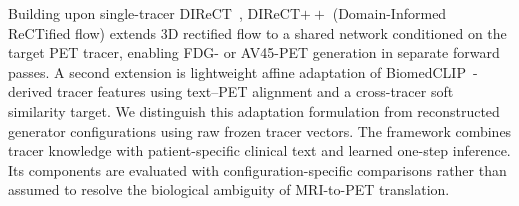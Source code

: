 Building upon single-tracer DIReCT~\cite{liu2025direct}, DIReCT$++$ (Domain-Informed ReCTified flow) extends 3D rectified flow to a shared network conditioned on the target PET tracer, enabling FDG- or AV45-PET generation in separate forward passes. A second extension is lightweight affine adaptation of BiomedCLIP~\cite{zhang2025multimodal}-derived tracer features using text--PET alignment and a cross-tracer soft similarity target. We distinguish this adaptation formulation from reconstructed generator configurations using raw frozen tracer vectors. The framework combines tracer knowledge with patient-specific clinical text and learned one-step inference. Its components are evaluated with configuration-specific comparisons rather than assumed to resolve the biological ambiguity of MRI-to-PET translation.
